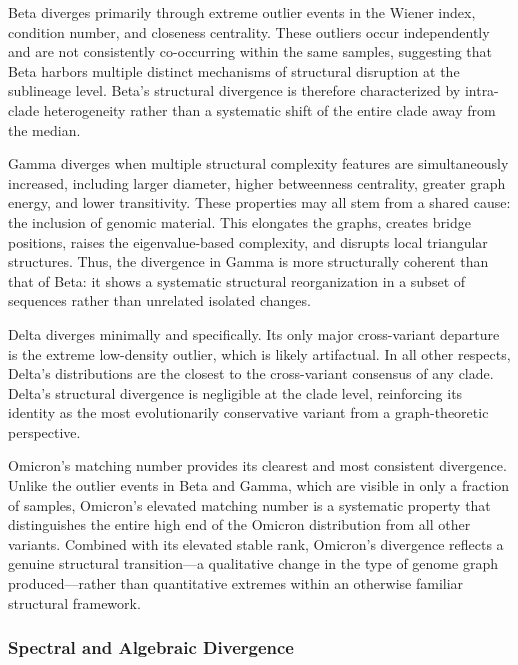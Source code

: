 \documentclass[conference]{IEEEtran}
\begin{document}
Beta diverges primarily through extreme outlier events in the Wiener index, condition number, and closeness centrality. These outliers occur independently and are not consistently co-occurring within the same samples, suggesting that Beta harbors multiple distinct mechanisms of structural disruption at the sublineage level. Beta's structural divergence is therefore characterized by intra-clade heterogeneity rather than a systematic shift of the entire clade away from the median.

Gamma diverges when multiple structural complexity features are simultaneously increased, including larger diameter, higher betweenness centrality, greater graph energy, and lower transitivity. These properties may all stem from a shared cause: the inclusion of genomic material. This elongates the graphs, creates bridge positions, raises the eigenvalue-based complexity, and disrupts local triangular structures. Thus, the divergence in Gamma is more structurally coherent than that of Beta: it shows a systematic structural reorganization in a subset of sequences rather than unrelated isolated changes.

Delta diverges minimally and specifically. Its only major cross-variant departure is the extreme low-density outlier, which is likely artifactual. In all other respects, Delta's distributions are the closest to the cross-variant consensus of any clade. Delta's structural divergence is negligible at the clade level, reinforcing its identity as the most evolutionarily conservative variant from a graph-theoretic perspective.

Omicron's matching number provides its clearest and most consistent divergence. Unlike the outlier events in Beta and Gamma, which are visible in only a fraction of samples, Omicron's elevated matching number is a systematic property that distinguishes the entire high end of the Omicron distribution from all other variants. Combined with its elevated stable rank, Omicron's divergence reflects a genuine structural transition---a qualitative change in the type of genome graph produced---rather than quantitative extremes within an otherwise familiar structural framework.

\subsubsection{Spectral and Algebraic Divergence}
\end{document}
